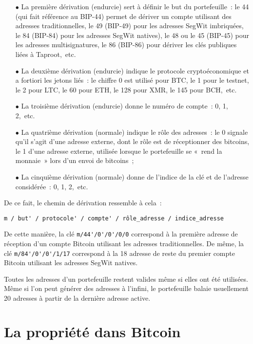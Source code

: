 \begin{itemize}
  \item[$\bullet$] La première dérivation (endurcie) sert à définir le but du portefeuille~: le 44 (qui fait référence au BIP-44) permet de dériver un compte utilisant des adresses traditionnelles, le 49 (BIP-49) pour les adresses SegWit imbriquées, le 84 (BIP-84) pour les adresses SegWit natives), le 48 ou le 45 (BIP-45) pour les adresses multisignatures, le 86 (BIP-86) pour dériver les clés publiques liées à Taproot,~etc.
  \item[$\bullet$] La deuxième dérivation (endurcie) indique le protocole cryptoéconomique et a fortiori les jetons liés~: le chiffre 0 est utilisé pour BTC, le 1 pour le testnet, le 2 pour LTC, le 60 pour ETH, le 128 pour XMR, le 145 pour BCH,~etc.
  \item[$\bullet$] La troisième dérivation (endurcie) donne le numéro de compte~: 0, 1, 2,~etc.
  \item[$\bullet$] La quatrième dérivation (normale) indique le rôle des adresses~: le 0 signale qu'il s'agit d'une adresse externe, dont le rôle est de réceptionner des bitcoins, le 1 d'une adresse externe, utilisée lorsque le portefeuille se «~rend la monnaie~» lors d'un envoi de bitcoins~;
  \item[$\bullet$] La cinquième dérivation (normale) donne de l'indice de la clé et de l'adresse considérée~: 0, 1, 2,~etc.
\end{itemize}

De ce fait, le chemin de dérivation ressemble à cela~:

\begin{Verbatim}[fontsize=\footnotesize]
m / but' / protocole' / compte' / rôle_adresse / indice_adresse
\end{Verbatim}

De cette manière, la clé \verb?m/44'/0'/0'/0/0? correspond à la première adresse de réception d'un compte Bitcoin utilisant les adresses traditionnelles. De même, la clé \verb?m/84'/0'/0'/1/17? correspond à la 18\ieme{} adresse de reste du premier compte Bitcoin utilisant les adresses SegWit natives.

Toutes les adresses d'un portefeuille restent valides même si elles ont été utilisées. Même si l'on peut générer des adresses à l'infini, le portefeuille balaie usuellement 20 adresses à partir de la dernière adresse active.

\section{La propriété dans Bitcoin} %

